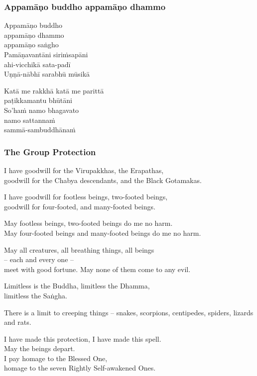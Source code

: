 \subsubsection{Appamāṇo buddho appamāṇo dhammo}



Appamāṇo buddho\\\vin appamāṇo dhammo\\\vin appamāṇo saṅgho\\
Pamāṇavantāni siriṁsapāni\\\vin ahi-vicchikā sata-padī\\
Uṇṇā-nābhī sarabhū mūsikā

Katā me rakkhā katā me parittā\\\vin paṭikkamantu bhūtāni\\
So'haṁ namo bhagavato\\\vin namo sattannaṁ\\\vin sammā-sambuddhānaṁ 

\subsubsection{The Group Protection}

I have goodwill for the Virupakkhas, the Erapathas,\\
goodwill for the Chabya descendants, and the Black Gotamakas.

I have goodwill for footless beings, two-footed beings,\\
goodwill for four-footed, and many-footed beings.

May footless beings, two-footed beings do me no harm.\\
May four-footed beings and many-footed beings do me no harm.

May all creatures, all breathing things, all beings\\\vin -- each and every one --\\
meet with good fortune. May none of them come to any evil.

Limitless is the Buddha, limitless the Dhamma,\\\vin limitless the Saṅgha.

There is a limit to creeping things -- snakes, scorpions, centipedes, spiders,
lizards and rats.

I have made this protection, I have made this spell.\\
May the beings depart.\\
I pay homage to the Blessed One,\\
homage to the seven Rightly Self-awakened Ones.


